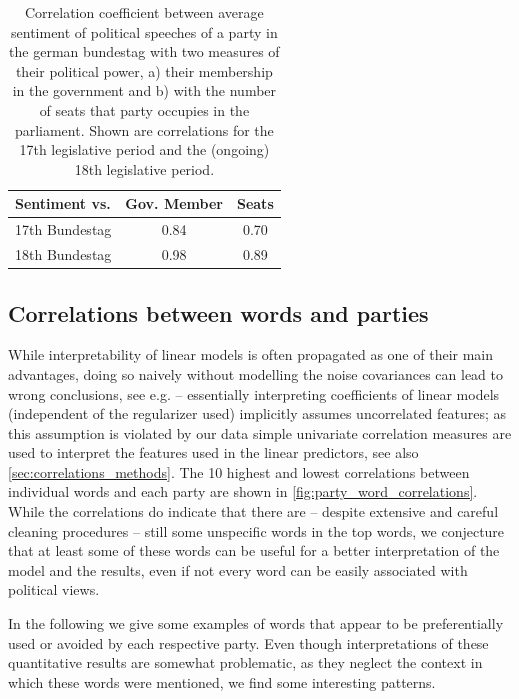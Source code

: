 \documentclass[runningheads,a4paper]{llncs}
\begin{document}
\begin{table}[t]
\begin{center}
\begin{tabular}{lcc}
   Sentiment vs. &          Gov. Member    &  Seats\\
\hline\hline
17th Bundestag    &  0.84 & 0.70\\
18th Bundestag   &  0.98 & 0.89\\
%
\end{tabular}
\end{center}
\caption{
\label{tab:sentiments}
Correlation coefficient between average sentiment of political speeches of a party in the german bundestag with two measures of their political power, a) their membership in the government and b) with the number of seats that party occupies in the parliament. Shown are correlations for the 17th legislative period and the (ongoing) 18th legislative period.
}
\end{table}



\subsection{Correlations between words and parties}\label{sec:word_party_correlations}

While interpretability of linear models is often propagated as one of their main advantages, doing so naively without modelling the noise covariances can lead to wrong conclusions, see e.g. \cite{Zien2009, Haufe2013} -- essentially interpreting coefficients of linear models (independent of the regularizer used) implicitly assumes uncorrelated features; as this assumption is violated by our data simple univariate correlation measures are used to interpret the features used in the linear predictors, see also \autoref{sec:correlations_methods}. The 10 highest and lowest correlations between individual words and each party are shown in \autoref{fig:party_word_correlations}. While the correlations do indicate that there are -- despite extensive and careful cleaning procedures -- still some unspecific words in the top words, we conjecture that at least some of these words can be useful for a better interpretation of the model and the results, even if not every word can be easily associated with political views. 

In the following we give some examples of words that appear to be preferentially used or avoided by each respective party. Even though interpretations of these quantitative results are somewhat problematic, as they neglect the context in which these words were mentioned, we find some interesting patterns. 
\end{document}
